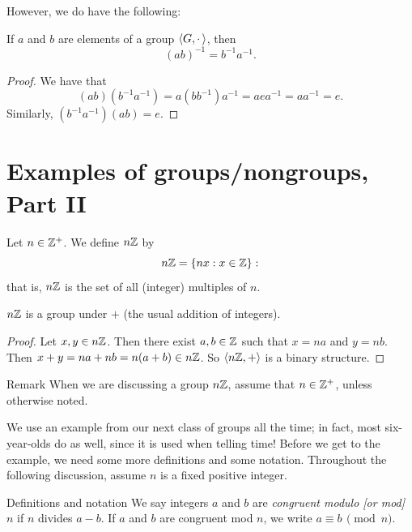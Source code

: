 
However, we do have the following:

\begin{thm}\label{invofprod} If $a$ and $b$ are elements of a group $\langle G, \cdot\,\rangle$, then $$(ab)^{-1}=b^{-1}a^{-1}.$$
\end{thm}

\begin{proof} We have that
$$(ab)(b^{-1}a^{-1})=a(bb^{-1})a^{-1}=aea^{-1}=aa^{-1}=e.$$
Similarly, $(b^{-1}a^{-1})(ab)=e$.\end{proof}
\section{Examples of groups/nongroups, Part II}

\begin{example}{} Let $n\in \mathbb{Z}^+$.  We define $n\mathbb{Z}$ by $$n\mathbb{Z}=\{nx: x\in \mathbb{Z}\}:$$ that is, $n\mathbb{Z}$ is the set of all (integer) multiples of $n$.

\begin{thm}\label{nz} $n\mathbb{Z}$ is a group under $+$ (the usual addition of integers).\end{thm}

\begin{proof} Let $x, y\in n\mathbb{Z}$. Then there exist $a,b\in \mathbb{Z}$ such that $x=na$ and $y=nb$.  Then $x+y=na+nb=n(a+b)\in n\mathbb{Z}$. So $\langle n\mathbb{Z},+\rangle$ is a binary structure.  \end{proof}
\end{example}

\begin{df}{Remark} When we are discussing a group $n\mathbb{Z}$, assume that $n\in \mathbb{Z}^+$, unless otherwise noted.\end{df}

 We use an  example from our next class of groups all the time;
in fact, most six-year-olds do as well, since it is used when
telling time! Before we get to the example, we need some more
definitions and some notation. Throughout the following discussion,
assume $n$ is a fixed positive integer.

\begin{df}{Definitions and notation} We say integers $a$ and $b$ are \textit{congruent
modulo [or mod] $n$} if $n$ divides $a-b$. If $a$ and $b$ are
congruent mod $n$, we write $a \equiv b\, \pmod{n}$.\end{df}

